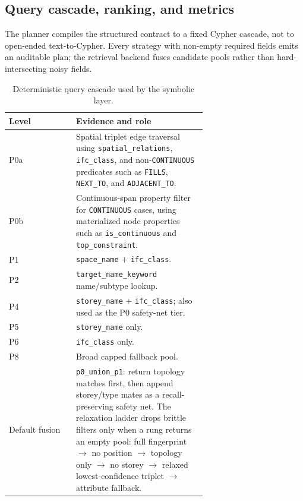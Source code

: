 \subsection{Query cascade, ranking, and metrics}
\label{app:query}

The planner compiles the structured contract to a fixed Cypher cascade, not to open-ended text-to-Cypher. Every strategy with non-empty required fields emits an auditable plan; the retrieval backend fuses candidate pools rather than hard-intersecting noisy fields.

\begin{table}[ht]
  \centering
  \small
  \begin{tabular}{lp{0.66\linewidth}}
    \toprule
    Level & Evidence and role \\
    \midrule
    P0a & Spatial triplet edge traversal using \texttt{spatial\_relations}, \texttt{ifc\_class}, and non-\texttt{CONTINUOUS} predicates such as \texttt{FILLS}, \texttt{NEXT\_TO}, and \texttt{ADJACENT\_TO}. \\
    P0b & Continuous-span property filter for \texttt{CONTINUOUS} cases, using materialized node properties such as \texttt{is\_continuous} and \texttt{top\_constraint}. \\
    P1 & \texttt{space\_name} + \texttt{ifc\_class}. \\
    P2 & \texttt{target\_name\_keyword} name/subtype lookup. \\
    P4 & \texttt{storey\_name} + \texttt{ifc\_class}; also used as the P0 safety-net tier. \\
    P5 & \texttt{storey\_name} only. \\
    P6 & \texttt{ifc\_class} only. \\
    P8 & Broad capped fallback pool. \\
    Default fusion & \texttt{p0\_union\_p1}: return topology matches first, then append storey/type mates as a recall-preserving safety net. The relaxation ladder drops brittle filters only when a rung returns an empty pool: full fingerprint $\rightarrow$ no position $\rightarrow$ topology only $\rightarrow$ no storey $\rightarrow$ relaxed lowest-confidence triplet $\rightarrow$ attribute fallback. \\
    \bottomrule
  \end{tabular}
  \caption{Deterministic query cascade used by the symbolic layer.}
  \label{tab:app-query}
\end{table}
\clearpage

